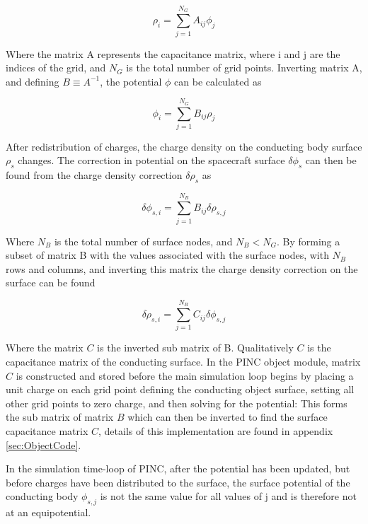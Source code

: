 \begin{equation}
    \rho_i = \sum^{N_G}_{j=1} A_{ij} \phi_j
\end{equation}

Where the matrix A represents the capacitance matrix, where i and j are the indices of the grid, and $N_G$ is the total number of grid points. Inverting matrix A, and defining $B \equiv A^{-1}$, the potential $\phi$ can be calculated as 

\begin{equation}
    \phi_i = \sum^{N_G}_{j=1} B_{ij} \rho_j
\end{equation}


After redistribution of charges, the charge density on the conducting body surface $\rho_s$ changes. The correction in potential on the spacecraft surface $\delta \phi_s$ can then be found from the charge density correction $\delta \rho_s$ as

\begin{equation}
    \delta \phi_{s,i} = \sum^{N_B}_{j=1} B_{ij} \delta \rho_{s,j}
\end{equation}

Where $N_B$ is the total number of surface nodes, and $N_B < N_G$. By forming a subset of matrix B with the values associated with the surface nodes, with $N_B$ rows and columns, and inverting this matrix the charge density correction on the surface can be found

\begin{equation}\label{eq:SCchargeCorr}
    \delta \rho_{s,i} = \sum^{N_B}_{j=1} C_{ij} \delta \phi_{s,j}
\end{equation}

Where the matrix $C$ is the inverted sub matrix of B. Qualitatively $C$ is the capacitance matrix of the conducting surface. In the PINC object module, matrix $C$ is constructed and stored before the main simulation loop begins by placing a unit charge on each grid point defining the conducting object surface, setting all other grid points to zero charge, and then solving for the potential: This forms the sub matrix of matrix $B$ which can then be inverted to find the surface capacitance matrix $C$, details of this implementation are found in appendix \ref{sec:ObjectCode}.

In the simulation time-loop of PINC, after the potential has been updated, but before charges have been distributed to the surface, the surface potential of the conducting body $\phi_{s,j}$ is not the same value for all values of j and is therefore not at an equipotential. 

